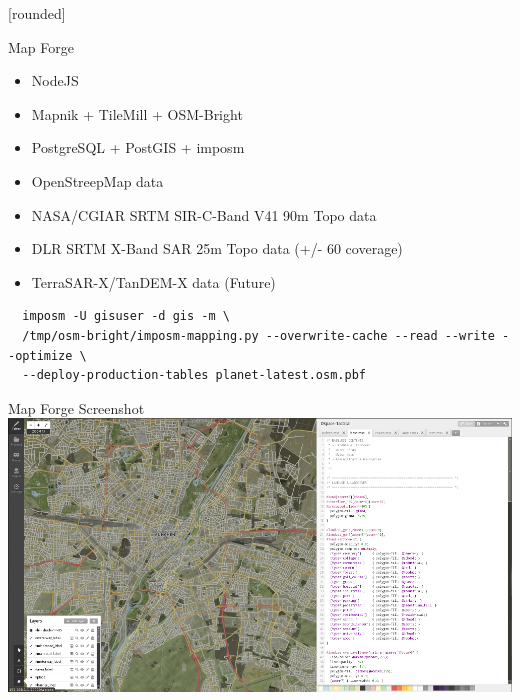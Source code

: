 \documentclass{beamer}
\newcommand\Fontvi{\fontsize{6}{7.2}\selectfont}
\begin{document}
[rounded]
\begin{frame}[fragile]{Map Forge}
 \begin{itemize}
  \item NodeJS
  \item Mapnik + TileMill + OSM-Bright
  \item PostgreSQL + PostGIS + imposm
  \item OpenStreepMap data
  \item NASA/CGIAR SRTM SIR-C-Band V41 90m Topo data
  \item DLR SRTM X-Band SAR 25m Topo data (+/- 60\° coverage)
  \item TerraSAR-X/TanDEM-X data (Future)
 \end{itemize}
\Fontvi
{}
\begin{block}{}
\begin{lstlisting}
  imposm -U gisuser -d gis -m \
  /tmp/osm-bright/imposm-mapping.py --overwrite-cache --read --write --optimize \
  --deploy-production-tables planet-latest.osm.pbf
\end{lstlisting}
\end{block}
\end{frame}

\begin{frame}{Map Forge Screenshot}
  \vspace{2ex}
  \includegraphics[scale=0.324]{images/tilemill-screenshot.png}
\end{frame}
\end{document}
